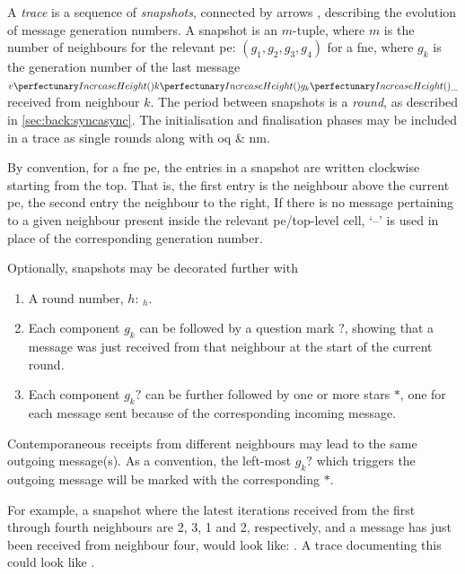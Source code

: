 A \emph{trace} is a sequence of \emph{snapshots}, connected by arrows \tarr{}, describing the evolution of message generation numbers. A snapshot is an \(m\)-tuple, where \(m\) is the number of neighbours for the relevant \gls{pe}:  \((g_1, g_2, g_3, g_4)\) for a \gls{fne}, where \(g_k\) is the generation number of the last message \(\cpvv{k}{g_k}{\cpdiscard}\) received from neighbour \(k\).  The period between snapshots is a \emph{round}, as described in \cref{sec:back:syncasync}.  The initialisation and finalisation phases may be included in a trace as single rounds along with \gls{oq} \& \gls{nm}.

By convention, for a \gls{fne} \gls{pe}, the entries in a snapshot are written clockwise starting from the top.  That is, the first entry is the neighbour above the current \gls{pe}, the second entry the neighbour to the right, \etc{}  If there is no message pertaining to a given neighbour present inside the relevant \gls{pe}/top-level cell, `--' is used in place of the corresponding generation number.

Optionally, snapshots may be decorated further with 
{\renewcommand{\theenumi}{\alph{enumi}}
\begin{enumerate}
    \item A round number, \(h\): \(_h\).
    \item Each component \(g_k\) can be followed by a question mark \(?\), showing that a message was just received from that neighbour at the start of the current round.
    \item Each component \(g_k?\) can be further followed by one or more stars \(*\), one for each message sent because of the corresponding incoming message.
\end{enumerate}}

Contemporaneous receipts from different neighbours may lead to the same outgoing message(s).  As a convention, the left-most \(g_k?\) which triggers the outgoing message will be marked with the corresponding \(*\).

For example, a snapshot where the latest iterations received from the first through fourth neighbours are 2, 3, 1 and 2, respectively, and a message has just been received from neighbour four, would look like:  .  A trace documenting this could look like  \tarr{} .